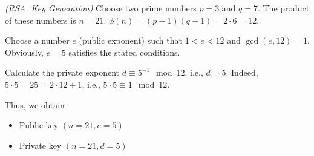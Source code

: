 \begin{example}
\emph{(RSA. Key Generation)}
Choose two prime numbers $p = 3$ and $q = 7$. The product of these numbers is $n = 21$. 
\(
\phi\left(n\right)=\left(p - 1 \right)\left(q - 1 \right) = 2 \cdot 6 = 12
\). 

Choose a number $e$ (public exponent) such that $1 < e < 12$ and  
$\gcd\left( e, 12 \right) = 1$. Obviously, $e = 5$ satisfies the stated conditions. 

Calculate the private exponent $d \equiv 5^{-1} \mod{12}$, i.e., $d = 5$. 
Indeed, $5 \cdot 5 = 25 = 2 \cdot 12 + 1$, i.e., $5 \cdot 5 \equiv 1 \mod{12}$.

Thus, we obtain
\begin{itemize}
\item Public key $\left(n=21, e=5\right)$
\item Private key $\left(n=21, d=5\right)$
\end{itemize}
\label{exAddRSAKeyGen}
\end{example}